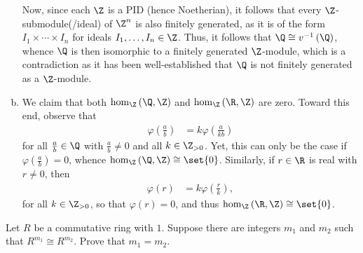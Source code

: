 \documentclass[10pt]{mypackage}
\begin{document}
\begin{solution}
\begin{enumerate}[(a)]
      Now, since each $\Z$ is a PID (hence Noetherian), it follows that every $\Z$-submodule(/ideal) of $\Z^{n}$ is also finitely generated, as it is of the form $I_1\times\cdots\times I_n$ for ideals $I_1,\dots,I_n\in \Z$. Thus, it follows that $\Q\cong v^{-1}\left( \Q \right)$, whence $\Q$ is then isomorphic to a finitely generated $\Z$-module, which is a contradiction as it has been well-established that $\Q$ is not finitely generated as a $\Z$-module.
    \item We claim that both $\hom_{\Z}\left( \Q,\Z \right)$ and $\hom_{\Z}\left( \R,\Z \right)$ are zero. Toward this end, observe that
      \begin{align*}
        \varphi\left( \frac{a}{b} \right) &= k\varphi\left( \frac{a}{kb} \right)
      \end{align*}
      for all $\frac{a}{b}\in \Q$ with $\frac{a}{b}\neq 0$ and all $k\in \Z_{ > 0 }$. Yet, this can only be the case if $\varphi\left( \frac{a}{b} \right)= 0$, whence $\hom_{\Z}\left( \Q,\Z \right) \cong \set{0}$. Similarly, if $r\in \R$ is real with $r\neq 0$, then
      \begin{align*}
        \varphi\left( r \right) &= k\varphi\left( \frac{r}{k} \right),
      \end{align*}
      for all $k\in \Z_{ > 0 }$, so that $\varphi\left( r \right) = 0$, and thus $\hom_{\Z}\left( \R,\Z \right)\cong \set{0}$.
  \end{enumerate}
\end{solution}
\begin{problem}[Problem 2]
  Let $R$ be a commutative ring with $1$. Suppose there are integers $m_1$ and $m_2$ such that $R^{m_1}\cong R^{m_2}$. Prove that $m_1 = m_2$.
\end{problem}
\end{document}
